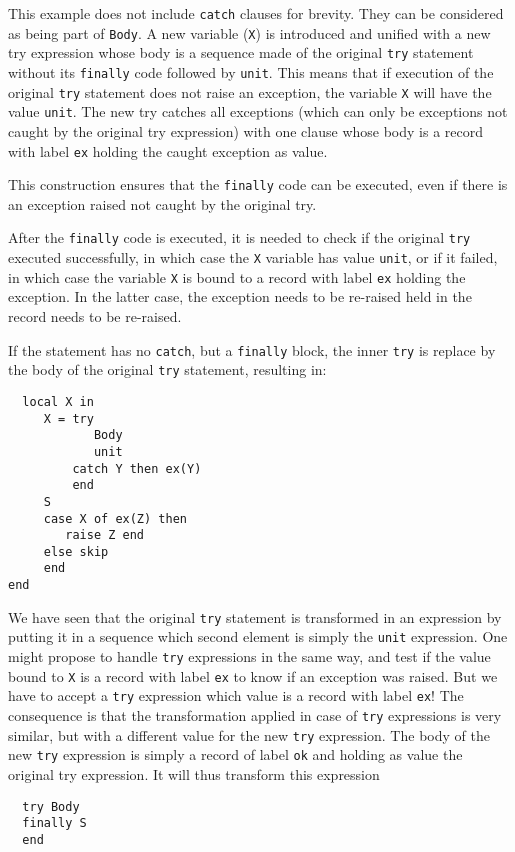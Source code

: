 \documentclass[a4paper]{memoir}
\begin{document}
This example does not include \lstinline!catch! clauses for brevity. They can be considered
as being part of \lstinline!Body!.
A new variable (\lstinline!X!) is introduced and unified with a new try
expression whose body is a sequence made of the original \lstinline!try! statement
without its \lstinline!finally! code followed by \lstinline!unit!.
This means that if execution of the original \lstinline!try! statement does not raise an
exception, the variable \lstinline!X! will have the value \lstinline!unit!.
The new try catches all exceptions (which can only be exceptions not caught
by the original try expression) with one clause whose body is a record with label
\lstinline!ex! holding the caught exception as value.

This construction ensures that the \lstinline!finally! code can be executed,
even if there is an exception raised not caught by the original try.

After the \lstinline!finally! code is executed, it is needed to check if the
original \lstinline!try! executed successfully, in which case the \lstinline!X!
variable has value \lstinline!unit!, or if it failed, in which case the variable
\lstinline!X! is bound to a record with label \lstinline!ex! holding the
exception. In the latter case, the exception needs to be re-raised held in the
record needs to be re-raised.

If the statement has no \lstinline!catch!, but a \lstinline!finally! block, the
inner \lstinline!try! is replace by the body of the original \lstinline!try!
statement, resulting in:
\begin{lstlisting}
  local X in 
     X = try 
            Body
            unit 
         catch Y then ex(Y)
         end 
     S 
     case X of ex(Z) then 
        raise Z end 
     else skip 
     end 
end  
\end{lstlisting}


We have seen that the original \lstinline!try! statement is transformed in an
expression by putting it in a sequence which second element is simply the
\lstinline!unit! expression. One might propose to handle \lstinline!try!
expressions in the same way, and test if the value bound to \lstinline!X! is a
record with label \lstinline!ex! to know if an exception was raised. 
But we have to accept a \lstinline!try! expression which
value is a record with label \lstinline!ex!! The consequence is that the
transformation applied in case of \lstinline!try! expressions is very similar, 
but with a different value for the new \lstinline!try! expression.
The body of the new \lstinline!try! expression is simply a record of label
\lstinline!ok! and holding as value the original try expression.
It will thus transform this expression
\begin{lstlisting}
  try Body
  finally S 
  end
\end{lstlisting}
\end{document}
